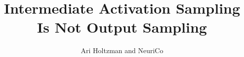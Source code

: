 \documentclass{article}
\title{Intermediate Activation Sampling Is Not Output Sampling}
\author{Ari Holtzman and NeuriCo}
\begin{document}
\maketitle

\begin{abstract}

\end{abstract}










\end{document}
